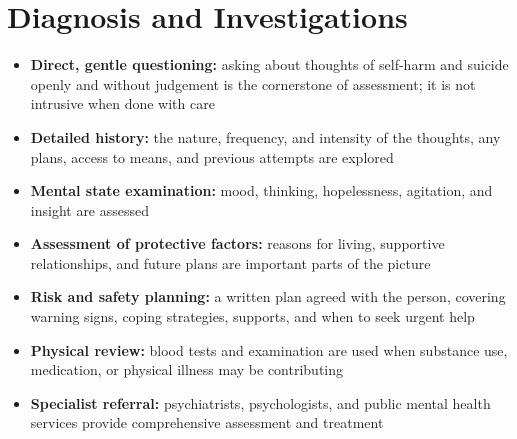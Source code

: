 \section*{Diagnosis and Investigations}
\begin{itemize}
    \item \textbf{Direct, gentle questioning:} asking about thoughts of self-harm and suicide openly and without judgement is the cornerstone of assessment; it is not intrusive when done with care
    \item \textbf{Detailed history:} the nature, frequency, and intensity of the thoughts, any plans, access to means, and previous attempts are explored
    \item \textbf{Mental state examination:} mood, thinking, hopelessness, agitation, and insight are assessed
    \item \textbf{Assessment of protective factors:} reasons for living, supportive relationships, and future plans are important parts of the picture
    \item \textbf{Risk and safety planning:} a written plan agreed with the person, covering warning signs, coping strategies, supports, and when to seek urgent help
    \item \textbf{Physical review:} blood tests and examination are used when substance use, medication, or physical illness may be contributing
    \item \textbf{Specialist referral:} psychiatrists, psychologists, and public mental health services provide comprehensive assessment and treatment
\end{itemize}

